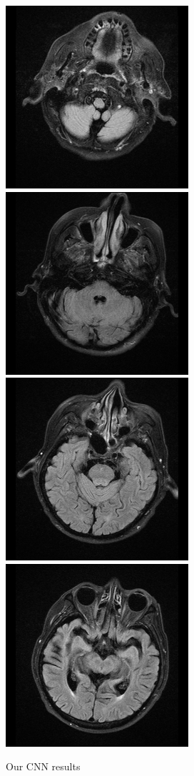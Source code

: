 \documentclass[conference]{IEEEtran}
\begin{document}
\begin{figure}[h!]
\centering 
\caption{Our CNN results}
\label{results}
\includegraphics[scale = 0.2]{origin_0.png}
\includegraphics[scale = 0.2]{origin_4.png}
\includegraphics[scale = 0.2]{origin_6.png}
\includegraphics[scale = 0.2]{origin_9.png}

\end{figure}
\end{document}
